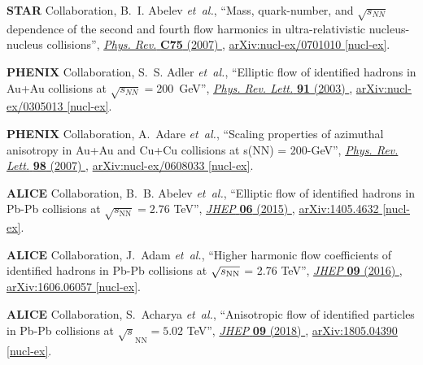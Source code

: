 \documentclass[ALICE,manyauthors]{cernphprep}
\begin{document}
\begin{thebibliography}{10}
{\bfseries STAR} Collaboration, B.~I. Abelev {\em et~al.}, ``{Mass,
  quark-number, and $\sqrt{s_{NN}}$ dependence of the second and fourth flow
  harmonics in ultra-relativistic nucleus-nucleus collisions}'',
  \href{http://dx.doi.org/10.1103/PhysRevC.75.054906}{{\em Phys. Rev.}
  {\bfseries C75} (2007) },
\href{http://arxiv.org/abs/nucl-ex/0701010}{{\ttfamily arXiv:nucl-ex/0701010
  [nucl-ex]}}.

{\bfseries PHENIX} Collaboration, S.~S. Adler {\em et~al.}, ``{Elliptic flow of
  identified hadrons in Au+Au collisions at $\sqrt{s_{NN}} = $200~GeV}'',
  \href{http://dx.doi.org/10.1103/PhysRevLett.91.182301}{{\em Phys. Rev. Lett.}
  {\bfseries 91} (2003) },
\href{http://arxiv.org/abs/nucl-ex/0305013}{{\ttfamily arXiv:nucl-ex/0305013
  [nucl-ex]}}.

{\bfseries PHENIX} Collaboration, A.~Adare {\em et~al.}, ``{Scaling properties
  of azimuthal anisotropy in Au+Au and Cu+Cu collisions at s(NN) = 200-GeV}'',
  \href{http://dx.doi.org/10.1103/PhysRevLett.98.162301}{{\em Phys. Rev. Lett.}
  {\bfseries 98} (2007) },
\href{http://arxiv.org/abs/nucl-ex/0608033}{{\ttfamily arXiv:nucl-ex/0608033
  [nucl-ex]}}.

{\bfseries ALICE} Collaboration, B.~B. Abelev {\em et~al.}, ``{Elliptic flow of
  identified hadrons in Pb-Pb collisions at $ \sqrt{s_{\mathrm{NN}}}=2.76 $
  TeV}'', \href{http://dx.doi.org/10.1007/JHEP06(2015)190}{{\em JHEP}
  {\bfseries 06} (2015) },
\href{http://arxiv.org/abs/1405.4632}{{\ttfamily arXiv:1405.4632 [nucl-ex]}}.

{\bfseries ALICE} Collaboration, J.~Adam {\em et~al.}, ``{Higher harmonic flow
  coefficients of identified hadrons in Pb-Pb collisions at $\sqrt{s_{\rm NN}}$
  = 2.76 TeV}'', \href{http://dx.doi.org/10.1007/JHEP09(2016)164}{{\em JHEP}
  {\bfseries 09} (2016) },
\href{http://arxiv.org/abs/1606.06057}{{\ttfamily arXiv:1606.06057 [nucl-ex]}}.

{\bfseries ALICE} Collaboration, S.~Acharya {\em et~al.}, ``{Anisotropic flow
  of identified particles in Pb-Pb collisions at $
  {\sqrt{s}}_{\mathrm{NN}}=5.02 $ TeV}'',
  \href{http://dx.doi.org/10.1007/JHEP09(2018)006}{{\em JHEP} {\bfseries 09}
  (2018) },
\href{http://arxiv.org/abs/1805.04390}{{\ttfamily arXiv:1805.04390 [nucl-ex]}}.


\end{thebibliography}
\end{document}
